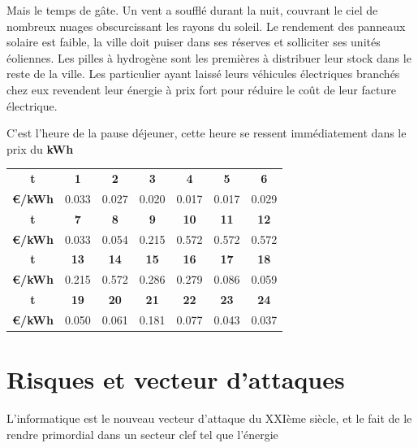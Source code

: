 Mais le temps de gâte. Un vent a soufflé durant la nuit, couvrant le ciel de nombreux nuages obscurcissant
les rayons du soleil. Le rendement des panneaux solaire est faible, la ville doit puiser dans
ses réserves et solliciter ses unités éoliennes.
Les pilles à hydrogène sont les premières à distribuer leur stock dans le reste de
la ville.
Les particulier ayant laissé leurs véhicules électriques branchés chez eux revendent leur énergie à prix
fort pour réduire le coût de leur facture électrique.

C'est l'heure de la pause déjeuner, cette heure se ressent immédiatement dans le prix du \textbf{kWh}


\begin{tabular}{ | c | c | c | c | c | c | c | }
  \hline
  \textbf{t} & \textbf{1} & \textbf{2} & \textbf{3} & \textbf{4} & \textbf{5} & \textbf{6} \\
  \textbf{€/kWh} & 0.033 & 0.027 & 0.020 & 0.017 & 0.017 & 0.029 \\
  \hline
  \textbf{t} & \textbf{7} & \textbf{8} & \textbf{9} & \textbf{10} & \textbf{11} & \textbf{12} \\
  \textbf{€/kWh} & 0.033 & 0.054 & 0.215 & 0.572 & 0.572 & 0.572 \\
  \hline
  \textbf{t} & \textbf{13} & \textbf{14} & \textbf{15} & \textbf{16} & \textbf{17} & \textbf{18} \\
  \textbf{€/kWh} & 0.215 & 0.572 & 0.286 & 0.279 & 0.086 & 0.059 \\
  \hline
  \textbf{t} & \textbf{19} & \textbf{20} & \textbf{21} & \textbf{22} & \textbf{23} & \textbf{24} \\
  \textbf{€/kWh} & 0.050 & 0.061 & 0.181 & 0.077 & 0.043 & 0.037 \\
  \hline
\end{tabular}



\section{Risques et vecteur d'attaques}

L'informatique est le nouveau vecteur d'attaque du XXIème siècle, et le fait de le rendre primordial
dans un secteur clef tel que l'énergie
